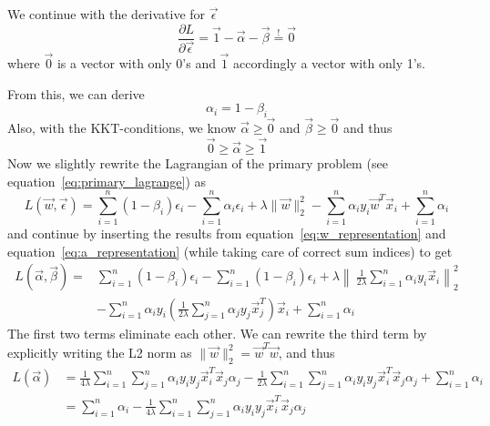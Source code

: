 \documentclass[a4paper]{article}
\begin{document}
We continue with the derivative for $\vec{\epsilon}$
\begin{equation*}
    \frac{\partial L}{\partial\vec{\epsilon}} =
    \vec{1} - \vec{\alpha} - \vec{\beta} \stackrel{!}{=} \vec{0}
\end{equation*}
where $\vec{0}$ is a vector with only 0's and $\vec{1}$ accordingly a vector
with only 1's.

From this, we can derive
\begin{equation}\label{eq:a_representation}
    \alpha_i = 1 - \beta_i
\end{equation}
Also, with the KKT-conditions, we know $\vec{\alpha}\geq\vec{0}$ and
$\vec{\beta}\geq\vec{0}$ and thus
\begin{equation}\label{eq:a_condition}
    \vec{0} \geq \vec{\alpha} \geq \vec{1}
\end{equation}
Now we slightly rewrite the Lagrangian of the primary problem (see
equation~\ref{eq:primary_lagrange}) as
\begin{equation*}
    L(\vec{w}, \vec{\epsilon}) =
    \sum_{i=1}^{n}(1-\beta_i)\epsilon_i
    - \sum_{i=1}^{n}\alpha_i\epsilon_i
    + \lambda\rVert\vec{w}\lVert_2^2
    - \sum_{i=1}^{n}\alpha_iy_i\vec{w}^T\vec{x}_i
    + \sum_{i=1}^{n}\alpha_i
\end{equation*}
and continue by inserting the results from equation~\ref{eq:w_representation}
and equation~\ref{eq:a_representation} (while taking care of correct sum
indices) to get
\begin{equation*}
\begin{split}
    L(\vec{\alpha}, \vec{\beta}) =
    &\sum_{i=1}^{n}(1-\beta_i)\epsilon_i
    - \sum_{i=1}^{n}(1-\beta_i)\epsilon_i
    + \lambda\left\rVert\
        \frac{1}{2\lambda}\sum_{i=1}^{n}\alpha_iy_i\vec{x}_i
    \right\lVert_2^2\\
    &- \sum_{i=1}^{n}\alpha_iy_i
    \left(\frac{1}{2\lambda}
        \sum_{j=1}^{n}\alpha_jy_j\vec{x}_j^T
    \right)\vec{x}_i
    + \sum_{i=1}^{n}\alpha_i
\end{split}
\end{equation*}
The first two terms eliminate each other. We can rewrite the third term by
explicitly writing the L2 norm as $\lVert\vec{w}\rVert_2^2=\vec{w}^T\vec{w}$,
and thus
\begin{equation*}
\begin{split}
    L(\vec{\alpha}) &= \frac{1}{4\lambda}
    \sum_{i=1}^{n}\sum_{j=1}^{n}\alpha_iy_iy_j\vec{x}_i^T\vec{x}_j\alpha_j
    - \frac{1}{2\lambda}
    \sum_{i=1}^{n}\sum_{j=1}^{n}\alpha_iy_iy_j\vec{x}_i^T\vec{x}_j\alpha_j
    + \sum_{i=1}^{n}\alpha_i\\
    &= \sum_{i=1}^{n}\alpha_i
    - \frac{1}{4\lambda}
    \sum_{i=1}^{n}\sum_{j=1}^{n}\alpha_iy_iy_j\vec{x}_i^T\vec{x}_j\alpha_j
\end{split}
\end{equation*}
\end{document}
